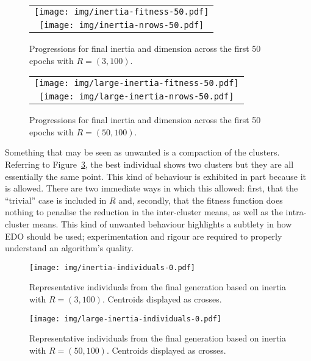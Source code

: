 \begin{figure}[htbp]
    \ContinuedFloat*
    \centering
    \begin{tabular}{c}
        \texttt{[image: img/inertia-fitness-50.pdf]}\\
        \texttt{[image: img/inertia-nrows-50.pdf]}
    \end{tabular}
    \caption{%
        \label{figure:inertia-50}
        Progressions for final inertia and dimension across the first 50
        epochs with \(R = (3, 100)\).
    }
\end{figure}

\begin{figure}[htbp]
    \ContinuedFloat%
    \centering
    \begin{tabular}{c}
        \texttt{[image: img/large-inertia-fitness-50.pdf]}\\
        \texttt{[image: img/large-inertia-nrows-50.pdf]}
    \end{tabular}
    \caption{%
        \label{figure:large-inertia-50}
        Progressions for final inertia and dimension across the first 50 epochs
        with \(R = (50, 100)\).
    }
\end{figure}

Something that may be seen as unwanted is a compaction of the clusters.
Referring to Figure~\ref{figure:inertia-individuals}, the best individual
shows
two clusters but they are all essentially the same point. This kind of behaviour
is exhibited in part because it is allowed. There are two immediate ways in
which this allowed: first, that the ``trivial'' case is included in \(R\) and,
secondly, that the fitness function does nothing to penalise the reduction in
the inter-cluster means, as well as the intra-cluster means. This kind of
unwanted behaviour highlights a subtlety in how EDO should be used;
experimentation and rigour are required to properly understand an algorithm's
quality.

\begin{figure}[htbp]
    \ContinuedFloat*
    \centering
    \texttt{[image: img/inertia-individuals-0.pdf]}
    \caption{%
        \label{figure:inertia-individuals}
        Representative individuals from the final generation based on inertia
        with \(R = (3, 100)\). Centroids displayed as crosses.
    }
\end{figure}

\begin{figure}[htbp]
    \ContinuedFloat%
    \centering
    \texttt{[image: img/large-inertia-individuals-0.pdf]}
    \caption{%
        \label{figure:large-inertia-individuals}
        Representative individuals from the final generation based on inertia
        with \(R = (50, 100)\). Centroids displayed as crosses.
    }
\end{figure}

